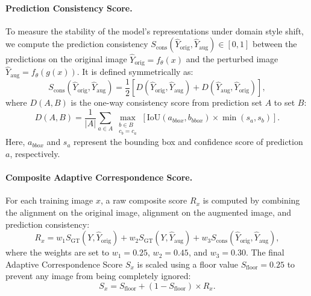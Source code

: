 \documentclass[12pt,a4paper]{article}
\begin{document}
\paragraph{Prediction Consistency Score.}
To measure the stability of the model's representations under domain style shift, we compute the prediction consistency $S_{\text{cons}}(\hat{Y}_{\text{orig}}, \hat{Y}_{\text{aug}}) \in [0, 1]$ between the predictions on the original image $\hat{Y}_{\text{orig}} = f_\theta(x)$ and the perturbed image $\hat{Y}_{\text{aug}} = f_\theta(g(x))$. It is defined symmetrically as:
\begin{equation}
    S_{\text{cons}}(\hat{Y}_{\text{orig}}, \hat{Y}_{\text{aug}}) = \frac{1}{2} \left[ D(\hat{Y}_{\text{orig}}, \hat{Y}_{\text{aug}}) + D(\hat{Y}_{\text{aug}}, \hat{Y}_{\text{orig}}) \right],
\end{equation}
where $D(A, B)$ is the one-way consistency score from prediction set $A$ to set $B$:
\begin{equation}
    D(A, B) = \frac{1}{|A|} \sum_{a \in A} \max_{\substack{b \in B \\ c_b = c_a}} \left[ \text{IoU}(a_{bbox}, b_{bbox}) \times \min(s_a, s_b) \right].
\end{equation}
Here, $a_{bbox}$ and $s_a$ represent the bounding box and confidence score of prediction $a$, respectively.

\paragraph{Composite Adaptive Correspondence Score.}
For each training image $x$, a raw composite score $R_x$ is computed by combining the alignment on the original image, alignment on the augmented image, and prediction consistency:
\begin{equation}
    R_x = w_1 S_{\text{GT}}(Y, \hat{Y}_{\text{orig}}) + w_2 S_{\text{GT}}(Y, \hat{Y}_{\text{aug}}) + w_3 S_{\text{cons}}(\hat{Y}_{\text{orig}}, \hat{Y}_{\text{aug}}),
\end{equation}
where the weights are set to $w_1 = 0.25$, $w_2 = 0.45$, and $w_3 = 0.30$. The final Adaptive Correspondence Score $S_x$ is scaled using a floor value $S_{\text{floor}} = 0.25$ to prevent any image from being completely ignored:
\begin{equation}
    S_x = S_{\text{floor}} + (1 - S_{\text{floor}}) \times R_x.
\end{equation}
\end{document}
